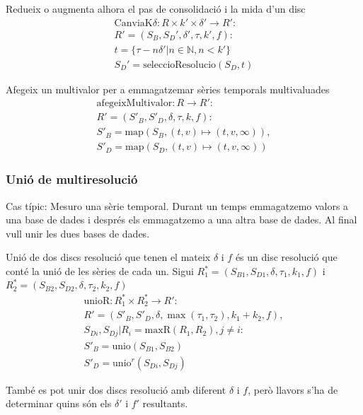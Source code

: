 Redueix o augmenta alhora el pas de consolidació i la mida d'un disc
  \begin{gather*}
    \text{CanviaK}\delta: R \times k' \times \delta' \longrightarrow R': \\
    R' = (S_B,S_D',\delta',\tau,k',f): \\    
    t = \{ \tau-n\delta' | n\in\mathbb{N},n<k' \} \\
    S_D' = \text{seleccioResolucio}(S_D,t)
  \end{gather*}




Afegeix un multivalor per a emmagatzemar sèries temporals multivaluades
  \begin{gather*}
    \text{afegeixMultivalor}: R \longrightarrow R': \\
    R' = (S'_{B},S'_{D},\delta,\tau,k,f): \\
    S'_{B} = \text{map}(S_B,(t,v)\mapsto(t,v,\infty)), \\
    S'_{D} = \text{map}(S_D,(t,v)\mapsto(t,v,\infty))
  \end{gather*}





\subsubsection{Unió de multiresolució}

Cas típic:
Mesuro una sèrie temporal. Durant un temps emmagatzemo valors a una
base de dades i després els emmagatzemo a una altra base de dades. Al final vull unir les dues bases de dades.


Unió de dos discs resolució que tenen el mateix $\delta$ i $f$ és un
disc resolució que conté la unió de les sèries de cada un.  Sigui
$R_1^*=(S_{B1},S_{D1},\delta,\tau_1,k_1,f)$ i
$R_2^*=(S_{B2},S_{D2},\delta,\tau_2,k_2,f)$
  \begin{gather*}
    \text{unioR}: R_1^* \times R_2^* \longrightarrow R': \\
    R' = (S'_B,S'_D,\delta,\max(\tau_1,\tau_2),k_1+k_2,f), \\
    S_{Di}, S_{Dj} | R_i = \text{maxR}(R_1,R_2), j \neq i:  \\
    S'_B = \text{unio}(S_{B1},S_{B2})\\
    S'_D = \text{unio}^r(S_{Di},S_{Dj})
\end{gather*}

També es pot unir dos discs resolució amb diferent $\delta$ i $f$,
però llavors s'ha de determinar quins són els $\delta'$ i $f'$
resultants.


